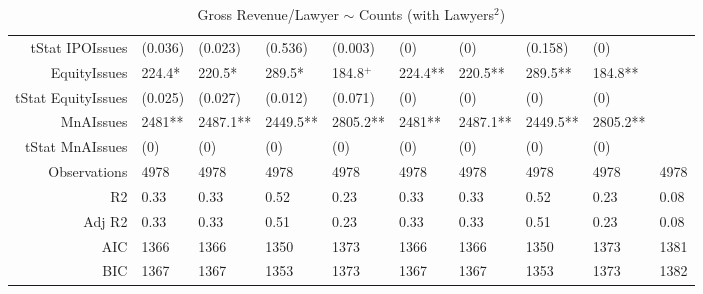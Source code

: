 \begin{table}[ht]
\begin{tabular}{rlllllllll}
  tStat IPOIssues & (0.036) & (0.023) & (0.536) & (0.003) & (0) & (0) & (0.158) & (0) &  \\ 
  EquityIssues & 224.4* & 220.5* & 289.5* & 184.8$^{+}$ & 224.4** & 220.5** & 289.5** & 184.8** &  \\ 
  tStat EquityIssues & (0.025) & (0.027) & (0.012) & (0.071) & (0) & (0) & (0) & (0) &  \\ 
  MnAIssues & 2481** & 2487.1** & 2449.5** & 2805.2** & 2481** & 2487.1** & 2449.5** & 2805.2** &  \\ 
  tStat MnAIssues & (0) & (0) & (0) & (0) & (0) & (0) & (0) & (0) &  \\ 
  Observations & 4978 & 4978 & 4978 & 4978 & 4978 & 4978 & 4978 & 4978 & 4978 \\ 
  R2 & 0.33 & 0.33 & 0.52 & 0.23 & 0.33 & 0.33 & 0.52 & 0.23 & 0.08 \\ 
  Adj R2 & 0.33 & 0.33 & 0.51 & 0.23 & 0.33 & 0.33 & 0.51 & 0.23 & 0.08 \\ 
  AIC & 1366 & 1366 & 1350 & 1373 & 1366 & 1366 & 1350 & 1373 & 1381 \\ 
  BIC & 1367 & 1367 & 1353 & 1373 & 1367 & 1367 & 1353 & 1373 & 1382 \\ 
   \hline
\end{tabular}
\caption{Gross Revenue/Lawyer $\sim$ Counts (with Lawyers$^2$)} 
\end{table}
